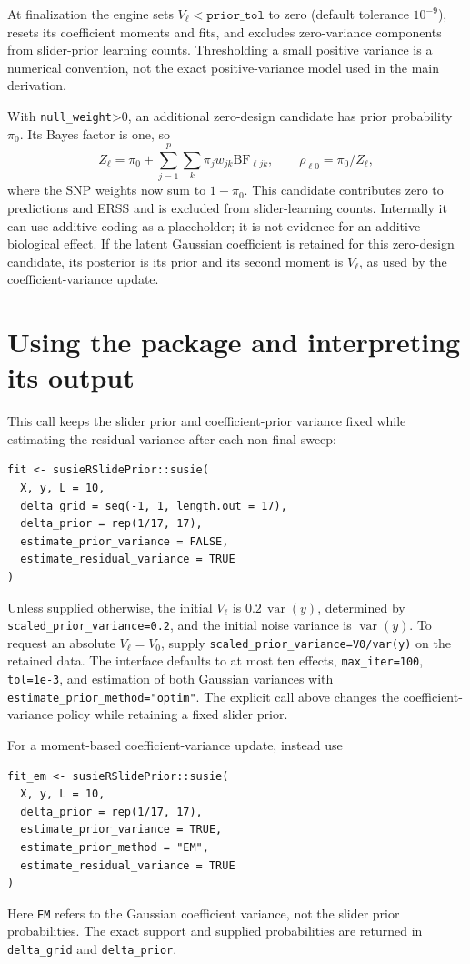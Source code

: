 \documentclass[11pt]{article}
\newcommand{\BF}{\mathrm{BF}}
\begin{document}
At finalization the engine sets $V_\ell<\texttt{prior\_tol}$ to zero
(default tolerance $10^{-9}$), resets its coefficient moments and fits,
and excludes zero-variance components from slider-prior learning counts.
Thresholding a small positive variance is a numerical convention, not
the exact positive-variance model used in the main derivation.

With \texttt{null\_weight}>0, an additional zero-design candidate has prior
probability $\pi_0$. Its Bayes factor is one, so
\begin{equation}
 Z_\ell=\pi_0+\sum_{j=1}^p\sum_k\pi_jw_{jk}\BF_{\ell jk},\qquad
 \rho_{\ell0}=\pi_0/Z_\ell,
 \label{eq:null}
\end{equation}
where the SNP weights now sum to $1-\pi_0$. This candidate contributes zero
to predictions and ERSS and is excluded from slider-learning counts.
Internally it can use additive coding as a placeholder; it is not evidence
for an additive biological effect. If the latent Gaussian coefficient is
retained for this zero-design candidate, its posterior is its prior and
its second moment is $V_\ell$, as used by the coefficient-variance update.

\section{Using the package and interpreting its output}
\label{sec:api}
This call keeps the slider prior and coefficient-prior variance fixed
while estimating the residual variance after each non-final sweep:
\begin{verbatim}
fit <- susieRSlidePrior::susie(
  X, y, L = 10,
  delta_grid = seq(-1, 1, length.out = 17),
  delta_prior = rep(1/17, 17),
  estimate_prior_variance = FALSE,
  estimate_residual_variance = TRUE
)
\end{verbatim}
Unless supplied otherwise, the initial $V_\ell$ is
$0.2\,\operatorname{var}(y)$, determined by
\texttt{scaled\_prior\_variance=0.2}, and the initial noise variance is
$\operatorname{var}(y)$. To request an absolute $V_\ell=V_0$, supply
\texttt{scaled\_prior\_variance=V0/var(y)} on the retained data.
The interface defaults to at most ten effects, \texttt{max\_iter=100},
\texttt{tol=1e-3}, and estimation of both Gaussian variances with
\texttt{estimate\_prior\_method="optim"}. The explicit call above changes
the coefficient-variance policy while retaining a fixed slider prior.

For a moment-based coefficient-variance update, instead use
\begin{verbatim}
fit_em <- susieRSlidePrior::susie(
  X, y, L = 10,
  delta_prior = rep(1/17, 17),
  estimate_prior_variance = TRUE,
  estimate_prior_method = "EM",
  estimate_residual_variance = TRUE
)
\end{verbatim}
Here \texttt{EM} refers to the Gaussian coefficient variance, not the slider
prior probabilities. The exact support and supplied probabilities are
returned in \texttt{delta\_grid} and \texttt{delta\_prior}.
\end{document}
